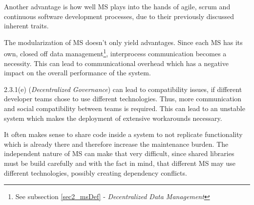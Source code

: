 Another advantage is how well MS plays into the hands of agile, scrum and continuous software development processes, due to their previously discussed inherent traits.

The modularization of MS doesn't only yield advantages. Since each MS has its own, closed off data management\footnote{See subsection \ref{sec2_msDef} - \emph{Decentralized Data Management}}, interprocess communication becomes a necessity. This can lead to communicational overhead which has a negative impact on the overall performance of the system\cite{Wolff16}.

2.3.1(e) (\emph{Decentralized Governance}) can lead to compatibility issues, if different developer teams chose to use different technologies. Thus, more communication and social compatibility between teams is required. This can lead to an unstable system which makes the deployment of extensive workarounds necessary\cite{Riggins15}.

It often makes sense to share code inside a system to not replicate functionality which is already there and therefore increase the maintenance burden. The independent nature of MS can make that very difficult, since shared libraries must be build carefully and with the fact in mind, that different MS may use different technologies, possibly creating dependency conflicts.



